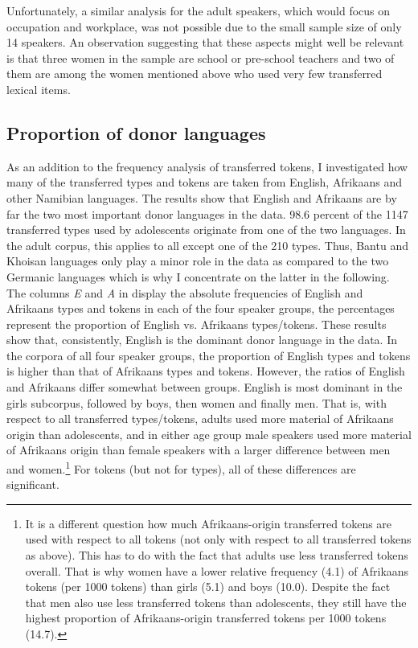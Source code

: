 \documentclass[output=paper]{langsci/langscibook}
\begin{document}
Unfortunately, a similar analysis for the adult speakers, which would focus on occupation and workplace, was not possible due to the small sample size of only 14 speakers. An observation suggesting that these aspects might well be relevant is that three women in the sample are school or pre-school teachers and two of them are among the women mentioned above who used very few transferred lexical items.

 
   
\subsection{Proportion of donor languages}
\label{sec:bracke:5.2}

As an addition to the frequency analysis of transferred tokens, I investigated how many of the transferred types and tokens are taken from English, Afrikaans and other Namibian languages. The results show that English and Afrikaans are by far the two most important donor languages in the data. 98.6 percent of the 1147 transferred types used by adolescents originate from one of the two languages. In the adult corpus, this applies to all except one of the 210 types. Thus, Bantu and Khoisan languages only play a minor role in the data as compared to the two Germanic languages which is why I concentrate on the latter in the following. The columns \textit{E} and \textit{A} in  display the absolute frequencies of English and Afrikaans types and tokens in each of the four speaker groups, the percentages represent the proportion of English vs. Afrikaans types/tokens. These results show that, consistently, English is the dominant donor language in the data. In the corpora of all four speaker groups, the proportion of English types and tokens is higher than that of Afrikaans types and tokens. However, the ratios of English and Afrikaans differ somewhat between groups. English is most dominant in the girls subcorpus, followed by boys, then women and finally men. That is, with respect to all transferred types/tokens, adults used more material of Afrikaans origin than adolescents, and in either age group male speakers used more material of Afrikaans origin than female speakers with a larger difference between men and women.\footnote{It is a different question how much Afrikaans-origin transferred tokens are used with respect to all tokens (not only with respect to all transferred tokens as above). This has to do with the fact that adults use less transferred tokens overall. That is why women have a lower relative frequency (4.1) of Afrikaans tokens (per 1000 tokens) than girls (5.1) and boys (10.0). Despite the fact that men also use less transferred tokens than adolescents, they still have the highest proportion of Afrikaans-origin transferred tokens per 1000 tokens (14.7).} For tokens (but not for types), all of these differences are significant.
\end{document}
